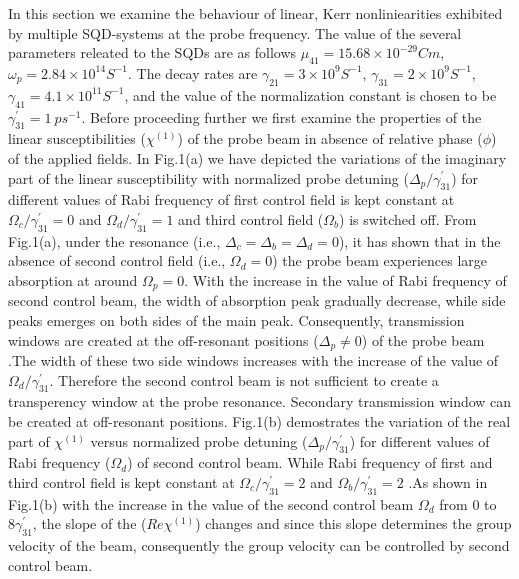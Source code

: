 \documentclass[12pt,a4paper]{article}
\begin{document}
In this section we examine the behaviour of linear, Kerr nonliniearities exhibited by multiple SQD-systems at the probe frequency. The value of the several parameters releated to the SQDs are as follows \(\mu_{41} = 15.68\times10^{-29} Cm\), \(\omega_p = 2.84\times10^{14} S^{-1}\). The decay rates are \(\gamma_{21}=3\times10^9S^{-1}\), \( \gamma_{31}=2\times10^9S^{-1} \), \( \gamma_{41}=4.1\times10^{11}S^{-1} \), and the value of the normalization constant is chosen to be \( \gamma^{\prime}_{31}=1\ ps^{-1} \). Before proceeding further we first examine the properties of the linear susceptibilities (\(\chi^{(1)}\)) of the probe beam in absence of relative phase ($\phi$) of the applied fields. In Fig.1(a) we have depicted the variations of the imaginary part of the linear susceptibility with normalized probe detuning ($\Delta_p/\gamma^{\prime}_{31}$) for different values of Rabi frequency of first control field is kept constant at $\Omega_c/\gamma^{\prime}_{31}=0$ and $\Omega_d/\gamma^{\prime}_{31}=1$ and third control field ($\Omega_b$) is switched off. From Fig.1(a), under the resonance (i.e., $\Delta_c = \Delta_b = \Delta_d = 0$), it has shown that in the absence of second control field (i.e., $\Omega_d = 0$) the probe beam experiences large absorption at around $\Omega_p=0$. With the increase in the value of Rabi frequency of second control beam, the width of absorption peak gradually decrease, while side peaks emerges on both sides of the main peak. Consequently, transmission windows are created at the off-resonant positions ($\Delta_p \neq 0$) of the probe beam .The width of these two side windows increases with the increase of the value of $\Omega_d/\gamma^{\prime}_{31}$. Therefore the second control beam is not sufficient to create a transperency window at the probe resonance. Secondary transmission window can be created at off-resonant positions. Fig.1(b) demostrates the variation of the real part of $\chi^{(1)}$ versus normalized probe detuning ($\Delta_p/\gamma^{\prime}_{31}$) for different values of Rabi frequency ($\Omega_{d}$) of second control beam. While Rabi frequency of first and third control field is kept constant at $\Omega_{c}/\gamma^{\prime}_{31}=2$ and $\Omega_{b}/\gamma^{\prime}_{31}=2$ .As shown in Fig.1(b) with the increase in the value of the second control beam $\Omega_{d}$ from $0$ to $8\gamma^{\prime}_{31}$, the slope of the ($Re\chi^{(1)}$) changes and since this slope determines the group velocity of the beam, consequently the group velocity can be controlled by second control beam. \par
\end{document}

